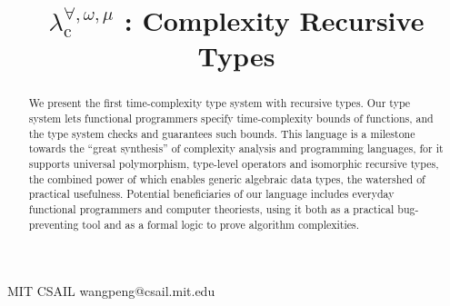 \documentclass[preprint]{sigplanconf}
\newcommand{\logo}{\lambda^{\forall,\omega,\mu}_\mathrm{c}}
\begin{document}
\setlength{\pdfpageheight}{\paperheight}
\setlength{\pdfpagewidth}{\paperwidth}






\title{$\logo$ : Complexity Recursive Types}

           {MIT CSAIL}
           {wangpeng@csail.mit.edu}

\maketitle

\begin{abstract}
We present the first time-complexity type system with recursive types. Our type system lets functional programmers specify time-complexity bounds of functions, and the type system checks and guarantees such bounds. This language is a milestone towards the ``great synthesis'' of complexity analysis and programming languages, for it supports universal polymorphism, type-level operators and isomorphic recursive types, the combined power of which enables generic algebraic data types, the watershed of practical usefulness. Potential beneficiaries of our language includes everyday functional programmers and computer theoriests, using it both as a practical bug-preventing tool and as a formal logic to prove algorithm complexities.
\end{abstract}


\end{document}
